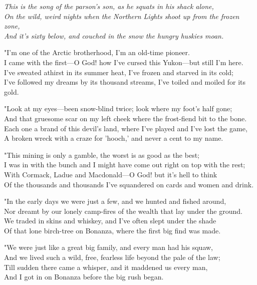 

\begin{poemblock}
\textit{
This is the song of the parson's son, as he squats in his shack alone,\\
On the wild, weird nights when the Northern Lights shoot up from the frozen zone,\\
And it's sixty below, and couched in the snow the hungry huskies moan.
}

"I'm one of the Arctic brotherhood, I'm an old-time pioneer.\\
I came with the first—O God! how I've cursed this Yukon—but still I'm here.\\
I've sweated athirst in its summer heat, I've frozen and starved in its cold;\\
I've followed my dreams by its thousand streams, I've toiled and moiled for its gold.

"Look at my eyes—been snow-blind twice; look where my foot's half gone;\\
And that gruesome scar on my left cheek where the frost-fiend bit to the bone.\\
Each one a brand of this devil's land, where I've played and I've lost the game,\\
A broken wreck with a craze for 'hooch,' and never a cent to my name.

"This mining is only a gamble, the worst is as good as the best;\\
I was in with the bunch and I might have come out right on top with the rest;\\
With Cormack, Ladue and Macdonald—O God! but it's hell to think\\
Of the thousands and thousands I've squandered on cards and women and drink.

"In the early days we were just a few, and we hunted and fished around,\\
Nor dreamt by our lonely camp-fires of the wealth that lay under the ground.\\
We traded in skins and whiskey, and I've often slept under the shade\\
Of that lone birch-tree on Bonanza, where the first big find was made.

"We were just like a great big family, and every man had his squaw,\\
And we lived such a wild, free, fearless life beyond the pale of the law;\\
Till sudden there came a whisper, and it maddened us every man,\\
And I got in on Bonanza before the big rush began.


\end{poemblock}
